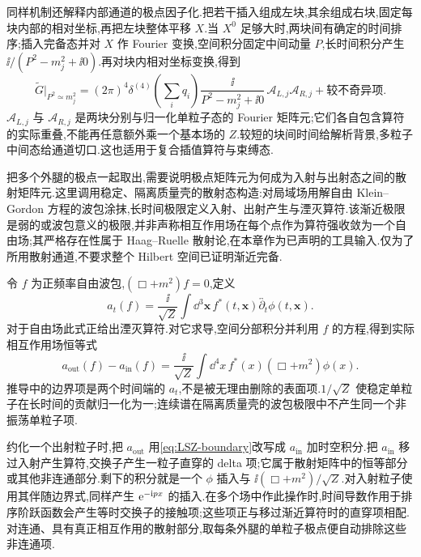 同样机制还解释内部通道的极点因子化.把若干插入组成左块,其余组成右块,固定每块内部的相对坐标,再把左块整体平移 $X$.当 $X^0$ 足够大时,两块间有确定的时间排序;插入完备态并对 $X$ 作 Fourier 变换,空间积分固定中间动量 $P$,长时间积分产生 $\ii/(P^2-m_j^2+\ii0)$.再对块内相对坐标变换,得到
\[
 \widetilde G\big|_{P^2\simeq m_j^2}
 =(2\pi)^4\delta^{(4)}\left(\sum_iq_i\right)
 \frac{\ii}{P^2-m_j^2+\ii0}\,\mathcal A_{L,j}\mathcal A_{R,j}
 +\text{较不奇异项}.
\]
$\mathcal A_{L,j}$ 与 $\mathcal A_{R,j}$ 是两块分别与归一化单粒子态的 Fourier 矩阵元;它们各自包含算符的实际重叠,不能再任意额外乘一个基本场的 $Z$.较短的块间时间给解析背景,多粒子中间态给通道切口.这也适用于复合插值算符与束缚态.

把多个外腿的极点一起取出,需要说明极点矩阵元为何成为入射与出射态之间的散射矩阵元.这里调用稳定、隔离质量壳的散射态构造:对局域场用解自由 Klein--Gordon 方程的波包涂抹,长时间极限定义入射、出射产生与湮灭算符.该渐近极限是弱的或波包意义的极限,并非声称相互作用场在每个点作为算符强收敛为一个自由场;其严格存在性属于 Haag--Ruelle 散射论,在本章作为已声明的工具输入.仅为了所用散射通道,不要求整个 Hilbert 空间已证明渐近完备.

令 $f$ 为正频率自由波包,$(\Box+m^2)f=0$,定义
\[
 a_t(f)=\frac{\ii}{\sqrt Z}\int\dd^3\boldsymbol x\,
 f^*(t,\boldsymbol x)\overleftrightarrow{\partial_t}\phi(t,\boldsymbol x).
\]
对于自由场此式正给出湮灭算符.对它求导,空间分部积分并利用 $f$ 的方程,得到实际相互作用场恒等式
\begin{equation}\label{eq:LSZ-boundary}
 a_{\mathrm{out}}(f)-a_{\mathrm{in}}(f)
 =\frac{\ii}{\sqrt Z}\int\dd^4x\,f^*(x)(\Box+m^2)\phi(x).
\end{equation}
推导中的边界项是两个时间端的 $a_t$,不是被无理由删除的表面项.$1/\sqrt Z$ 使稳定单粒子在长时间的贡献归一化为一;连续谱在隔离质量壳的波包极限中不产生同一个非振荡单粒子项.

约化一个出射粒子时,把 $a_{\mathrm{out}}$ 用\eqref{eq:LSZ-boundary}改写成 $a_{\mathrm{in}}$ 加时空积分.把 $a_{\mathrm{in}}$ 移过入射产生算符,交换子产生一粒子直穿的 delta 项;它属于散射矩阵中的恒等部分或其他非连通部分.剩下的积分就是一个 $\phi$ 插入与 $\ii(\Box+m^2)/\sqrt Z$.对入射粒子使用其伴随边界式,同样产生 $\mathrm e^{-\mathrm i px}$ 的插入.在多个场中作此操作时,时间导数作用于排序阶跃函数会产生等时交换子的接触项;这些项正与移过渐近算符时的直穿项相配.对连通、具有真正相互作用的散射部分,取每条外腿的单粒子极点便自动排除这些非连通项.

